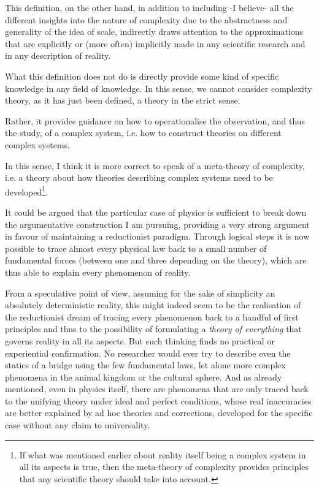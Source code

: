 This definition, on the other hand, in addition to including -I believe- all the different insights into the nature of complexity due to the abstractness and generality of the idea of scale, indirectly draws attention to the approximations that are explicitly or (more often) implicitly made in any scientific research and in any description of reality.

What this definition does not do is directly provide some kind of specific knowledge in any field of knowledge.
In this sense, we cannot consider complexity theory, as it has just been defined, a theory in the strict sense.

Rather, it provides guidance on how to operationalise the observation, and thus the study, of a complex system, i.e. how to construct theories on different complex systems.

In this sense, I think it is more correct to speak of a meta-theory of complexity, i.e. a theory about how theories describing complex systems need to be developed\footnote{If what was mentioned earlier about reality itself being a complex system in all its aspects is true, then the meta-theory of complexity provides principles that any scientific theory should take into account.}.

It could be argued that the particular case of physics is sufficient to break down the argumentative construction I am pursuing, providing a very strong argument in favour of maintaining a reductionist paradigm.
Through logical steps it is now possible to trace almost every physical law back to a small number of fundamental forces (between one and three depending on the theory), which are thus able to explain every phenomenon of reality.

From a speculative point of view, assuming for the sake of simplicity an absolutely deterministic reality, this might indeed seem to be the realisation of the reductionist dream of tracing every phenomenon back to a handful of first principles and thus to the possibility of formulating a \textit{theory of everything} that governs reality in all its aspects. But such thinking finds no practical or experiential confirmation.
No researcher would ever try to describe even the statics of a bridge using the few fundamental laws, let alone more complex phenomena in the animal kingdom or the cultural sphere.
And as already mentioned, even in physics itself, there are phenomena that are only traced back to the unifying theory under ideal and perfect conditions, whose real inaccuracies are better explained by ad hoc theories and corrections, developed for the specific case without any claim to universality.

